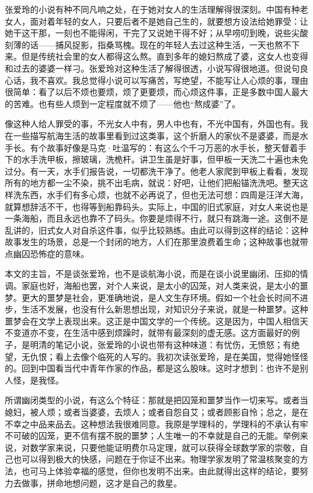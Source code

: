 张爱玲的小说有种不同凡响之处，在于她对女人的生活理解得很深刻。中国有种老女人，面对着年轻的女人，只要后者不是她自己生的，就要想方设法给她罪受：让她干这干那，一刻也不能得闲，干完了又说她干得不好；从早唠叨到晚，说些尖酸刻薄的话——捕风捉影，指桑骂槐。现在的年轻人去过这种生活，一天也熬不下来。但是传统社会里的女人都得这么熬。直到多年的媳妇熬成了婆，这女人也变得和过去的婆婆一样刁。张爱玲对这种生活了解得很透，小说写得很地道。但说句良心话，我不喜欢。我总觉得小说可以写痛苦，写绝望，不能写让人心烦的事，理由很简单：看了以后不烦也要烦，烦了更要烦，而心烦这件事，正是多数中国人最大的苦难。也有些人烦到一定程度就不烦了——他也“熬成婆”了。　 

像这种人给人罪受的事，不光女人中有，男人中也有，不光中国有，外国也有。我在一些描写航海生活的故事里看到过这类事，这个折磨人的家伙不是婆婆，而是水手长。有个故事好像是马克·吐温写的：有这么个千刁万恶的水手长，整天督着手下的水手洗甲板，擦玻璃，洗桅杆。讲卫生虽是好事，但甲板一天洗二十遍也未免过分。有一天，水手们报告说，一切都洗干净了。他老人家爬到甲板上看看，发现所有的地方都一尘不染，挑不出毛病，就说：好吧，让他们把船锚洗洗吧。整天这样洗东西，水手们有多心烦，也就不必再说了，但也无法可想：四周是汪洋大海，就算想辞活不干，也得等到船靠码头。实际上，中国的旧式家庭，对女人来说也是一条海船，而且永远也靠不了码头。你要是烦得不行，就只有跳海一途。这倒不是乱讲的，旧式女人对自杀这件事，似乎比较熟练。由此可以得到这样的结论：这种故事发生的场景，总是一个封闭的地方，人们在那里浪费着生命；这种故事也就带点幽囚恐怖症的意味。　 

本文的主旨，不是谈张爱玲，也不是谈航海小说，而是在谈小说里幽闭、压抑的情调。家庭也好，海船也罢，对个人来说，是太小的囚笼，对人类来说，是太小的噩梦。更大的噩梦是社会，更准确地说，是人文生存环境。假如一个社会长时间不进步，生活不发展，也没有什么新思想出现，对知识分子来说，就是一种噩梦。这种噩梦会在文学上表现出来。这正是中国文学的一个传统。这是因为，中国人相信天不变道亦不变，在生活中感到烦躁时，就带有最深刻的虚无感。这方面最好的例子，是明清的笔记小说，张爱玲的小说也带有这种味道：有忧伤，无愤怒；有绝望，无仇恨；看上去像个临死的人写的。我初次读张爱玲，是在美国，觉得她怪怪的。回到中国看当代中青年作家的作品，都是这么股味。这时才想到：也许不是别人怪，是我怪。　 

所谓幽闭类型的小说，有这么个特征：那就是把囚笼和噩梦当作一切来写。或者当媳妇，被人烦；或者当婆婆，去烦人；或者自怨自艾；或者顾影自怜；总之，是在不幸之中品来品去。这种想法我很难同意。我原是学理科的，学理科的不承认有牢不可破的囚笼，更不信有摆不脱的噩梦；人生唯一的不幸就是自己的无能。举例来说，对数学家来说，只要他能证明费尔马定理，就可以获得全球数学家的崇敬，自己也可以得到极大的快感，问题在于你证不出来。物理学家发明了常温核聚变的方法，也可马上体验幸福的感觉，但你也发明不出来。由此就得出这样的结论，要努力去做事，拼命地想问题，这才是自己的救星。　 

